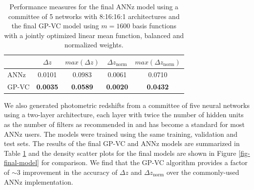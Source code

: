 \documentclass[useAMS,usenatbib,fleqn]{mn2e}
\begin{document}
 \begin{table}
\caption{Performance measures for the final ANNz model using a committee of 5 networks with 8:16:16:1 architectures and the final GP-VC model using $m=1600$ basis functions with a jointly optimized linear mean function, balanced and normalized weights.}
\begin{center}
  \begin{tabular}{| l | c | c | c | c |}
     				&	$\Delta z$	&	$max\left(\Delta z\right)$		&	$\Delta z_\textrm{norm}$		&	$max\left(\Delta z_\textrm{norm}\right)$	\\	\hline
	ANNz		&	0.0101		&	0.0983			&	0.0061				&	0.0710				\\
	GP-VC	&	\textbf{0.0035}		&	\textbf{0.0589}			&	\textbf{0.0020}			&	\textbf{0.0432}				\\	\hline
  \end{tabular}
\end{center}
\label{table-GP-ANN}
\end{table}

We also generated photometric redshifts from a committee of five neural networks using a two-layer architecture, each layer with twice the number of hidden units as the number of filters as recommended in \cite{Collister04} and has become a standard for most ANNz users. The models were trained using the same training, validation and test sets. The results of the final GP-VC and ANNz models are summarized in Table \ref{table-GP-ANN} and the density scatter plots for the final models are shown in Figure \ref{fig-final-model} for comparison. We find that the GP-VC algorithm provides a factor of $\sim 3$ improvement in the accuracy of $\Delta z$ and $\Delta z_\textrm{norm}$ over the commonly-used ANNz implementation.
\end{document}
